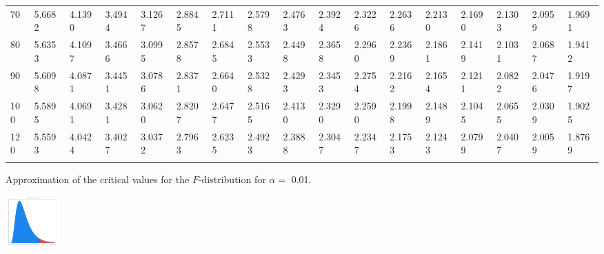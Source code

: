 {\begin{tabular}{|m{8pt}|m{18pt}*{15}{m{18pt}}}
 70 & 5.6682 & 4.1390 & 3.4944 & 3.1267 & 2.8845 & 2.7111 & 2.5798 & 2.4763 & 2.3924 & 2.3226 & 2.2636 & 2.2130 & 2.1690 & 2.1303 & 2.0959 & 1.9691 \\[2pt] \arrayrulecolor{light-gray}\hline\arrayrulecolor{black}  
 80 & 5.6353 & 4.1097 & 3.4666 & 3.0995 & 2.8578 & 2.6845 & 2.5533 & 2.4498 & 2.3658 & 2.2960 & 2.2369 & 2.1861 & 2.1419 & 2.1031 & 2.0687 & 1.9412 \\[2pt] \arrayrulecolor{light-gray}\hline\arrayrulecolor{black}  
 90 & 5.6098 & 4.0871 & 3.4451 & 3.0786 & 2.8371 & 2.6640 & 2.5328 & 2.4293 & 2.3453 & 2.2754 & 2.2162 & 2.1654 & 2.1211 & 2.0822 & 2.0476 & 1.9197 \\[2pt] \arrayrulecolor{light-gray}\hline\arrayrulecolor{black}  
100 & 5.5895 & 4.0691 & 3.4281 & 3.0620 & 2.8207 & 2.6477 & 2.5165 & 2.4130 & 2.3290 & 2.2590 & 2.1998 & 2.1489 & 2.1045 & 2.0655 & 2.0309 & 1.9025 \\[2pt] \arrayrulecolor{light-gray}\hline\arrayrulecolor{black}  
120 & 5.5593 & 4.0424 & 3.4027 & 3.0372 & 2.7963 & 2.6235 & 2.4923 & 2.3888 & 2.3047 & 2.2347 & 2.1753 & 2.1243 & 2.0799 & 2.0407 & 2.0059 & 1.8769 \\[2pt] \arrayrulecolor{light-gray}\hline\arrayrulecolor{black}  
\end{tabular}}
\clearpage

Approximation of the critical values for the $F$-distribution for
$\alpha=$ 0.01. 

\includegraphics[height=2.0cm]{img/FDistribution}

